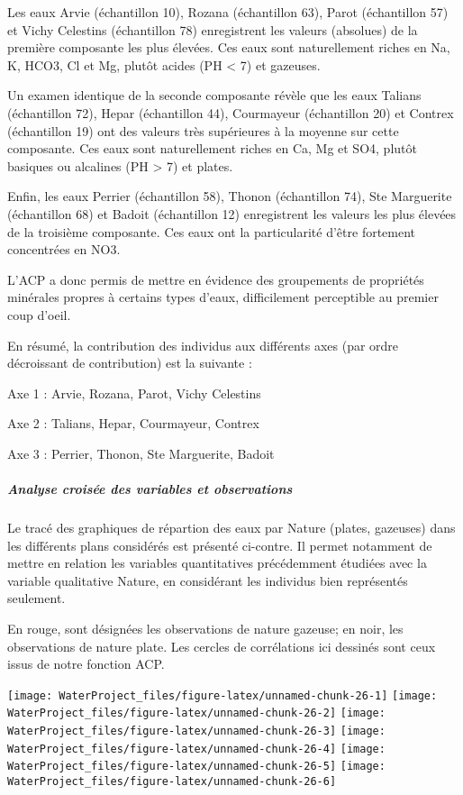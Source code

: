 \documentclass[]{article}
\let\oldsubparagraph\subparagraph
\renewcommand{\subparagraph}[1]{\oldsubparagraph{#1}\mbox{}}
\begin{document}
Les eaux Arvie (échantillon 10), Rozana (échantillon 63), Parot
(échantillon 57) et Vichy Celestins (échantillon 78) enregistrent les
valeurs (absolues) de la première composante les plus élevées. Ces eaux
sont naturellement riches en Na, K, HCO3, Cl et Mg, plutôt acides (PH
\textless{} 7) et gazeuses.

Un examen identique de la seconde composante révèle que les eaux Talians
(échantillon 72), Hepar (échantillon 44), Courmayeur (échantillon 20) et
Contrex (échantillon 19) ont des valeurs très supérieures à la moyenne
sur cette composante. Ces eaux sont naturellement riches en Ca, Mg et
SO4, plutôt basiques ou alcalines (PH \textgreater{} 7) et plates.

Enfin, les eaux Perrier (échantillon 58), Thonon (échantillon 74), Ste
Marguerite (échantillon 68) et Badoit (échantillon 12) enregistrent les
valeurs les plus élevées de la troisième composante. Ces eaux ont la
particularité d'être fortement concentrées en NO3.

L'ACP a donc permis de mettre en évidence des groupements de propriétés
minérales propres à certains types d'eaux, difficilement perceptible au
premier coup d'oeil.

En résumé, la contribution des individus aux différents axes (par ordre
décroissant de contribution) est la suivante :

Axe 1 : Arvie, Rozana, Parot, Vichy Celestins

Axe 2 : Talians, Hepar, Courmayeur, Contrex

Axe 3 : Perrier, Thonon, Ste Marguerite, Badoit

\subparagraph{\texorpdfstring{Analyse croisée des variables et
observations}{ Analyse croisée des variables et observations}}\label{analyse-croisee-des-variables-et-observations}

Le tracé des graphiques de répartion des eaux par Nature (plates,
gazeuses) dans les différents plans considérés est présenté ci-contre.
Il permet notamment de mettre en relation les variables quantitatives
précédemment étudiées avec la variable qualitative Nature, en
considérant les individus bien représentés seulement.

En rouge, sont désignées les observations de nature gazeuse; en noir,
les observations de nature plate. Les cercles de corrélations ici
dessinés sont ceux issus de notre fonction ACP.

\texttt{[image: WaterProject\_files/figure-latex/unnamed-chunk-26-1]}
\texttt{[image: WaterProject\_files/figure-latex/unnamed-chunk-26-2]}
\texttt{[image: WaterProject\_files/figure-latex/unnamed-chunk-26-3]}
\texttt{[image: WaterProject\_files/figure-latex/unnamed-chunk-26-4]}
\texttt{[image: WaterProject\_files/figure-latex/unnamed-chunk-26-5]}
\texttt{[image: WaterProject\_files/figure-latex/unnamed-chunk-26-6]}
\end{document}
